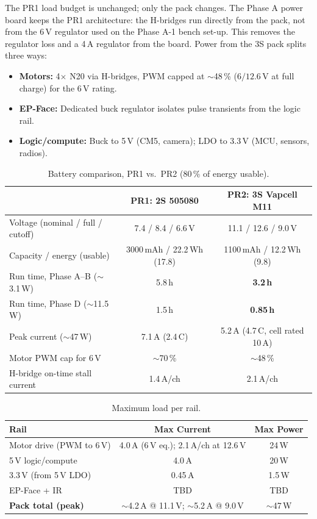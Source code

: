 \documentclass[12pt,a4paper]{article}
\begin{document}
The PR1 load budget is unchanged; only the pack changes. The Phase A power
board keeps the PR1 architecture: the H-bridges run directly from the pack,
not from the 6\,V regulator used on the Phase A-1 bench set-up. This removes
the regulator loss and a 4\,A regulator from the board. Power from the 3S
pack splits three ways:
\begin{itemize}
  \item \textbf{Motors:} 4$\times$ N20 via H-bridges, PWM capped at
        $\sim$48\,\% ($6/12.6$\,V at full charge) for the 6\,V rating.
  \item \textbf{EP-Face:} Dedicated buck regulator isolates pulse transients
        from the logic rail.
  \item \textbf{Logic/compute:} Buck to 5\,V (CM5, camera); LDO to 3.3\,V
        (MCU, sensors, radios).
\end{itemize}

\begin{table}[H]
\centering\small
\caption{Battery comparison, PR1 vs.\ PR2 (80\,\% of energy usable).}
\label{tab:battery-change}
\begin{tabular}{@{}lcc@{}}
\toprule
 & \textbf{PR1: 2S 505080} & \textbf{PR2: 3S Vapcell M11} \\
\midrule
Voltage (nominal / full / cutoff) & 7.4 / 8.4 / 6.6\,V & 11.1 / 12.6 / 9.0\,V \\
Capacity / energy (usable) & 3000\,mAh / 22.2\,Wh (17.8) & 1100\,mAh / 12.2\,Wh (9.8) \\
Run time, Phase A--B ($\sim$3.1\,W) & 5.8\,h & \textbf{3.2\,h} \\
Run time, Phase D ($\sim$11.5\,W) & 1.5\,h & \textbf{0.85\,h} \\
Peak current ($\sim$47\,W) & 7.1\,A (2.4\,C) & 5.2\,A (4.7\,C, cell rated 10\,A) \\
Motor PWM cap for 6\,V & $\sim$70\,\% & $\sim$48\,\% \\
H-bridge on-time stall current & 1.4\,A/ch & 2.1\,A/ch \\
\bottomrule
\end{tabular}
\end{table}

\begin{table}[H]
\centering\small
\caption{Maximum load per rail.}
\label{tab:rail-max}
\begin{tabular}{@{}lcc@{}}
\toprule
\textbf{Rail} & \textbf{Max Current} & \textbf{Max Power} \\
\midrule
Motor drive (PWM to 6\,V) & 4.0\,A (6\,V eq.); 2.1\,A/ch at 12.6\,V & 24\,W \\
5\,V logic/compute & 4.0\,A & 20\,W \\
3.3\,V (from 5\,V LDO) & 0.45\,A & 1.5\,W \\
EP-Face + IR & TBD & TBD \\
\midrule
\textbf{Pack total (peak)} & $\sim$4.2\,A @ 11.1\,V; $\sim$5.2\,A @ 9.0\,V & $\sim$47\,W \\
\bottomrule
\end{tabular}
\end{table}
\end{document}
